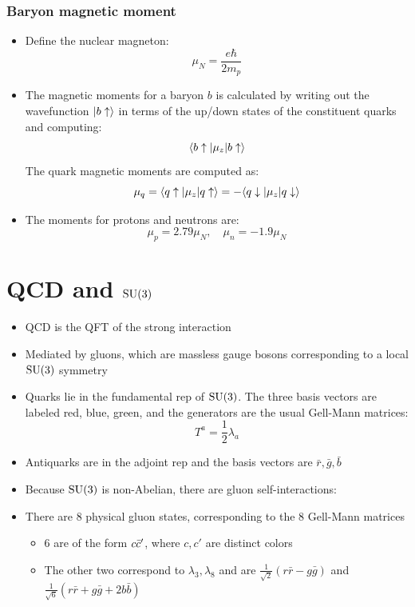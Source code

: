 \subsubsection{Baryon magnetic moment}
\begin{itemize}
  \item Define the nuclear magneton:
  \begin{equation}
    \mu_N = \frac{e\hbar}{2m_p}
  \end{equation}
  \item The magnetic moments for a baryon $b$ is calculated by writing out the wavefunction $|b\uparrow\rangle$ in terms of the up/down states of the constituent quarks and computing:
  \begin{equation}
    \langle b\uparrow | \mu_z | b\uparrow\rangle
  \end{equation}
  The quark magnetic moments are computed as:
  \begin{equation}
    \mu_q = \langle q\uparrow | \mu_z | q\uparrow\rangle = - \langle q\downarrow | \mu_z | q\downarrow\rangle
  \end{equation}
  \item The moments for protons and neutrons are:
  \begin{equation}
    \mu_p = 2.79\mu_N,\quad \mu_n = -1.9\mu_N
  \end{equation}
\end{itemize}


\section{QCD and $\operatorname{SU}(3)$}
\begin{itemize}
  \item QCD is the QFT of the strong interaction
    \item Mediated by gluons, which are massless gauge bosons corresponding to a local $\operatorname{SU}(3)$ symmetry
    \item Quarks lie in the fundamental rep of $\operatorname{SU}(3)$. The three basis vectors are labeled red, blue, green, and the generators are the usual Gell-Mann matrices:
    \begin{equation}
      T^a = \frac{1}{2}\lambda_a
    \end{equation}
    \item Antiquarks are in the adjoint rep and the basis vectors are $\bar r,\bar g, \bar b$
    \item Because $\operatorname{SU}(3)$ is non-Abelian, there are gluon self-interactions:
    \item There are 8 physical gluon states, corresponding to the 8 Gell-Mann matrices
    \begin{itemize}
      \item 6 are of the form $c\bar{c}'$, where $c,c'$ are distinct colors
      \item The other two correspond to $\lambda_3,\lambda_8$ and are $\frac{1}{\sqrt2}(r\bar r-g\bar g)$ and $\frac{1}{\sqrt6}(r\bar r + g\bar g + 2b\bar b)$
    \end{itemize}
\end{itemize}


